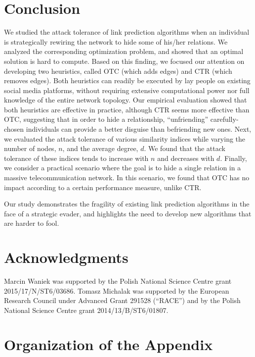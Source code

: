 \documentclass[twocolumn]{article}
\begin{document}
\section*{Conclusion}
We studied the attack tolerance of link prediction algorithms when an individual is strategically rewiring the network to hide some of his/her relations. We analyzed the corresponding optimization problem, and showed that an optimal solution is hard to compute. Based on this finding, we focused our attention on developing two heuristics, called OTC (which adds edges) and CTR (which removes edges). Both heuristics can readily be executed by lay people on existing social media platforms, without requiring extensive computational power nor full knowledge of the entire network topology. Our empirical evaluation showed that both heuristics are effective in practice, although CTR seems more effective than OTC, suggesting that in order to hide a relationship, ``unfriending'' carefully-chosen individuals can provide a better disguise than befriending new ones. Next, we evaluated the attack tolerance of various similarity indices while varying the number of nodes, $n$, and the average degree, $d$. We found that the attack tolerance of these indices tends to increase with $n$ and decreases with $d$. Finally, we consider a practical scenario where the goal is to hide a single relation in a massive telecommunication network. In this scenario, we found that OTC has no impact according to a certain performance measure, unlike CTR.

Our study demonstrates the fragility of existing link prediction algorithms in the face of a strategic evader, and highlights the need to develop new algorithms that are harder to fool.

\section*{Acknowledgments}
Marcin Waniek was supported by the Polish National Science Centre grant 2015/17/N/ST6/03686.
Tomasz Michalak was supported by the European Research Council under Advanced Grant 291528 (``RACE'') and by the Polish National Science Centre grant 2014/13/B/ST6/01807.

{\fontsize{8}{8}\selectfont{


}}

\appendix

\onecolumn

\section*{Organization of the Appendix}
\end{document}
